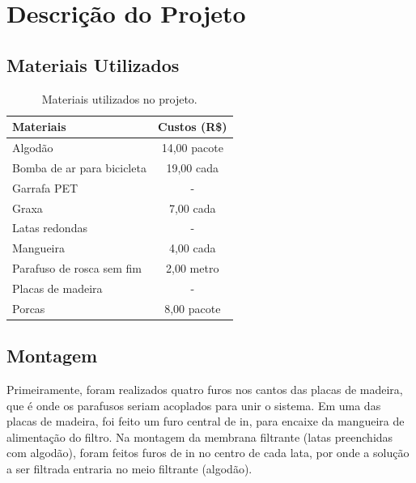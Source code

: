 \chapter{Descrição do Projeto}\label{descricao}

\section{Materiais Utilizados}

\begin{table}[H]
\centering
\caption{Materiais utilizados no projeto.}
\label{tab:materiais}
\begin{tabular}{lc}
\textbf{Materiais}         & \multicolumn{1}{l}{\textbf{Custos (R\$)}} \\ \toprule
Algodão                    &      14,00 pacote                   \\
Bomba de ar para bicicleta &      19,00 cada                     \\
Garrafa PET                & -                                   \\
Graxa                      &       7,00 cada                     \\
Latas redondas             & -                                   \\
Mangueira                  &       4,00 cada                     \\
Parafuso de rosca sem fim  &       2,00 metro                    \\
Placas de madeira          & -                                   \\
  Porcas                   &       8,00 pacote                   \\ \bottomrule
\end{tabular}
\end{table}

\section{Montagem}
\label{sec:montagem}

Primeiramente, foram realizados quatro furos nos cantos das placas de madeira,
que é onde os parafusos seriam acoplados para unir o sistema. Em uma das placas
de madeira, foi feito um furo central de  \si{in}, para encaixe
da mangueira de alimentação do filtro. Na montagem da membrana filtrante (latas
preenchidas com algodão), foram feitos furos de  \si{in} no
centro de cada lata, por onde a solução a ser filtrada entraria no meio
filtrante (algodão).

